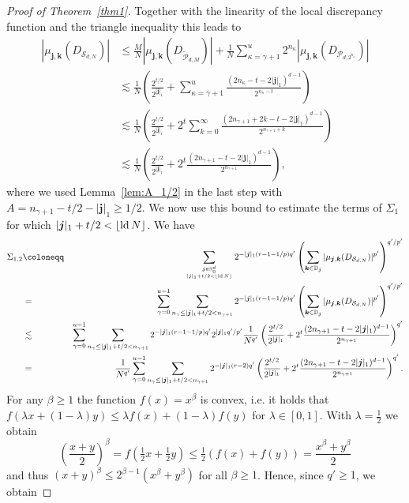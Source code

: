 \documentclass[12pt, a4paper]{article}
\def\P{\mathcal{P}}
\def\S{\mathcal{S}}
\newcommand{\ld}{{\rm ld}\,}
\newcommand{\peter}[1]{\begingroup\color{violet}#1\endgroup}
\newcommand{\bsj}{{\boldsymbol{j}}}
\newcommand{\bsk}{{\boldsymbol{k}}}
\newcommand{\bbN}{{\mathbb{N}}}
\newcommand{\bbD}{{\mathbb{D}}}
\begin{document}
\begin{proof}[Proof of Theorem~\ref{thm1}]
Together with the linearity of the local discrepancy function and the triangle inequality this leads to 
\begin{align*}%
 |\mu_{\bsj,\bsk}(D_{\S_{d,N}})| &\le \frac{M}{N} |\mu_{\bsj,\bsk}(D_{\widetilde{\P}_{d,M}})| + \frac{1}{N}\sum_{\kappa=\gamma+1}^u 2^{n_\kappa} |\mu_{\bsj,\bsk}(D_{\P_{d,2^{n_\kappa}}})|\nonumber\\
 &\lesssim \frac{1}{N}\left( \frac{2^{t/2}}{2^{|\bsj|_1}} + \sum_{\kappa=\gamma+1}^u  \frac{(2n_\kappa - t - 2|\bsj|_1)^{d-1}}{2^{n_\kappa-t}}\right)\nonumber\\
 &\lesssim \frac{1}{N} \left(\frac{2^{t/2}}{2^{|\bsj|_1}} + 2^t\sum_{k=0}^{\infty}  \frac{(2n_{\gamma+1} +2k - t - 2|\bsj|_1)^{d-1}}{2^{n_{\gamma+1}+k}}\right)\nonumber\\
 &\lesssim \frac{1}{N} \left(\frac{2^{t/2}}{2^{|\bsj|_1}} + 2^t \frac{(2n_{\gamma+1} - t - 2|\bsj|_1)^{d-1}}{2^{n_{\gamma+1}}}\right),
\end{align*}
where we used Lemma~\ref{lem:A_1/2} %
in the last step with $A = n_{\gamma+1}-t/2-|\bsj|_1 \geq 1/2$. %
We now use this bound to estimate the terms of $\Sigma_1$ for which $|\bsj|_1+t/2 < \lfloor\ld N\rfloor$. We have
\begin{eqnarray*}
\Sigma_{1,2} & \coloneqq & \sum_{\bsj \in \bbN_{0}^d \atop |\bsj|_1+t/2 < \lfloor\ld N\rfloor} 2^{-|\bsj|_1 (r-1-1/p) q'} \left(\sum_{\bsk \in \bbD_{\bsj}} |\mu_{\bsj, \bsk}(D_{\S_{d,N}})|^{p'}\right)^{q'/p'} \\ 
& = & \sum_{\gamma=0}^{u-1} \sum_{n_{\gamma} \le |\bsj|_1+t/2 < n_{\gamma+1}}  2^{-|\bsj|_1 (r-1-1/p) q'} \left(\sum_{\bsk \in \bbD_{\bsj}} |\mu_{\bsj, \bsk}(D_{\S_{d,N}})|^{p'}\right)^{q'/p'}\\
& \lesssim & \sum_{\gamma=0}^{u-1} \sum_{n_{\gamma} \le |\bsj|_1+t/2 < n_{\gamma+1}}  2^{-|\bsj|_1 (r-1-1/p) q'} 2^{|\bsj|_1 q'/p'} \frac{1}{N^{q'}} \left(\frac{2^{t/2}}{2^{|\bsj|_1}} + 2^t \frac{(2n_{\gamma+1} - t - 2|\bsj|_1)^{d-1}}{2^{n_{\gamma+1}}}\right)^{q'} \\
& = & \frac{1}{N^{q'}} \sum_{\gamma=0}^{u-1} \sum_{n_{\gamma} \le |\bsj|_1+t/2 < n_{\gamma+1}}  2^{-|\bsj|_1 (r-2) q'} \left(\frac{2^{t/2}}{2^{|\bsj|_1}} + 2^t \frac{(2n_{\gamma+1} - t - 2|\bsj|_1)^{d-1}}{2^{n_{\gamma+1}}}\right)^{q'}.
\end{eqnarray*}
For any $\beta\geq1$ the function $f(x)=x^{\beta}$ is convex, i.e. it holds \peter{that} $f(\lambda x +(1-\lambda) y) \le \lambda f(x)+(1-\lambda) f(y)$ for $\lambda \in [0,1]$. With $\lambda=\tfrac{1}{2}$ we obtain $$\left(\frac{x+y}{2}\right)^{\beta} =f(\tfrac{1}{2} x+ \tfrac{1}{2} y) \le \tfrac{1}{2} (f(x)+f(y)) = \frac{x^{\beta}+y^{\beta}}{2}$$ and thus $(x+y)^{\beta} \le 2^{\beta-1} (x^{\beta}+y^{\beta})$ for all $\beta \ge 1$. Hence, since $q' \ge 1$, we obtain

\end{proof}
\end{document}

